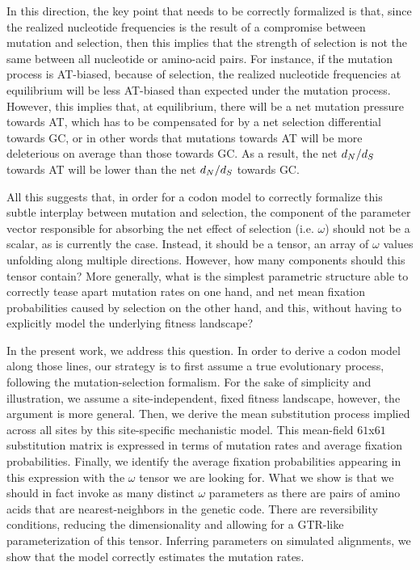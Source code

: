 In this direction, the key point that needs to be correctly formalized is that, since the realized nucleotide frequencies is the result of a compromise between mutation and selection, then this implies that the strength of selection is not the same between all nucleotide or amino-acid pairs.
For instance, if the mutation process is AT-biased, because of selection, the realized nucleotide frequencies at equilibrium will be less AT-biased than expected under the mutation process.
However, this implies that, at equilibrium, there will be a net mutation pressure towards AT, which has to be compensated for by a net selection differential towards GC, or in other words that mutations towards AT will be more deleterious on average than those towards GC.
As a result, the net $d_N / d_S$ towards AT will be lower than the net $d_N / d_S$ towards GC.

All this suggests that, in order for a codon model to correctly formalize this subtle interplay between mutation and selection, the component of the parameter vector responsible for absorbing the net effect of selection (i.e. $\omega$) should not be a scalar, as is currently the case.
Instead, it should be a tensor, an array of $\omega$ values unfolding along multiple directions.
However, how many components should this tensor contain?
More generally, what is the simplest parametric structure able to correctly tease apart mutation rates on one hand, and net mean fixation probabilities caused by selection on the other hand, and this, without having to explicitly model the underlying fitness landscape?

In the present work, we address this question.
In order to derive a codon model along those lines, our strategy is to first assume a true evolutionary process, following the mutation-selection formalism.
For the sake of simplicity and illustration, we assume a site-independent, fixed fitness landscape, however, the argument is more general.
Then, we derive the mean substitution process implied across all sites by this site-specific mechanistic model.
This mean-field $61$x$61$ substitution matrix is expressed in terms of mutation rates and average fixation probabilities.
Finally, we identify the average fixation probabilities appearing in this expression with the $\omega$ tensor we are looking for.
What we show is that we should in fact invoke as many distinct $\omega$ parameters as there are pairs of amino acids that are nearest-neighbors in the genetic code.
There are reversibility conditions, reducing the dimensionality and allowing for a GTR-like parameterization of this tensor.
Inferring parameters on simulated alignments, we show that the model correctly estimates the mutation rates.


